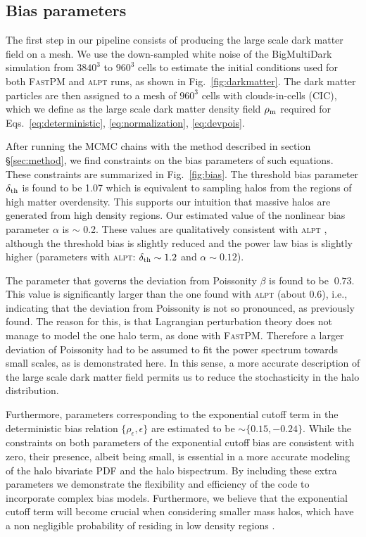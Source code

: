 \documentclass[english,usenatbib]{mn2e}
\begin{document}
\subsection{Bias parameters}

The first step in our pipeline consists of producing the large scale dark matter field on a mesh. We use the down-sampled  white noise of the BigMultiDark simulation from $3840^3$ to $960^3$ cells to estimate the initial conditions used for both \textsc{FastPM} and \textsc{alpt} runs, as shown in Fig.~\ref{fig:darkmatter}. The dark matter particles are then assigned to a mesh of $960^3$ cells with clouds-in-cells (CIC), which we define as the large scale dark matter density field $\rho_{\rm m}$ required for Eqs.~\ref{eq:deterministic}, \ref{eq:normalization}, \ref{eq:devpois}. 

After running the MCMC chains with the method described in section \S \ref{sec:method}, we find constraints on the bias parameters of such equations. These constraints are summarized in Fig.~\ref{fig:bias}.  
The threshold bias parameter $\delta_{\rm th}$ is found to be 1.07 which is equivalent to sampling halos from the regions of high matter overdensity. This supports our intuition that massive halos are generated from high density regions. Our estimated value of the nonlinear bias parameter $\alpha$ is $\sim$ 0.2. These values are qualitatively consistent with \textsc{alpt} \citep{kitaura2014}, although the threshold bias is slightly reduced and the power law bias is slightly higher (parameters with \textsc{alpt}: $\delta_{\rm th} \sim 1.2$ and $\alpha \sim 0.12$).

The parameter that governs the deviation from Poissonity $\beta$ is found to be $~ 0.73$. This value is significantly larger than the one found with \textsc{alpt} (about 0.6), i.e., indicating that the deviation from Poissonity is not so pronounced, as previously found. The reason for this, is that Lagrangian perturbation theory does not manage to model the one halo term, as done with \textsc{FastPM}. Therefore a larger deviation of Poissonity had to be assumed to fit the power spectrum towards small scales, as is demonstrated here. In this sense, a more accurate description of the large scale dark matter field permits us to reduce the stochasticity in the halo distribution.

Furthermore, parameters corresponding to the exponential cutoff term in the deterministic bias relation $\{\rho_{\epsilon},\epsilon\}$ are estimated to be $\sim \{0.15,-0.24\}$. While the constraints on both parameters of the exponential cutoff bias are consistent with zero, their presence, albeit being small, is essential in a more accurate modeling of the halo bivariate PDF and the halo bispectrum. By including these extra parameters we demonstrate the flexibility and  efficiency of the code to incorporate complex bias models. Furthermore, we believe that the  exponential cutoff term will become crucial when considering smaller mass halos, which have a non negligible probability of residing in low density regions \citep[][]{neyrinck2014}.
\end{document}
